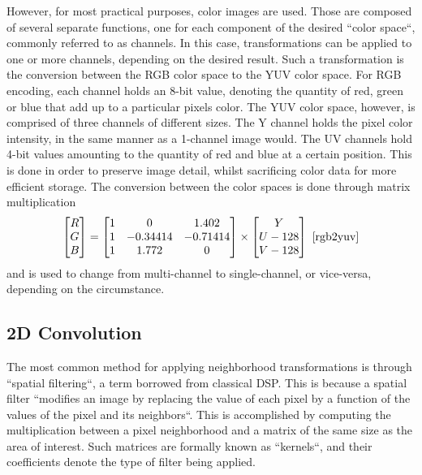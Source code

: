 However, for most practical purposes, color images are used. Those are composed of several separate functions,
one for each component of the desired ``color space``, commonly referred to as channels. In this case,
transformations can be applied to one or more channels, depending on the desired result. Such a transformation
is the conversion between the RGB color space to the YUV color space. For RGB encoding, each channel holds
an 8-bit value, denoting the quantity of red, green or blue that add up to a particular pixels color. The YUV
color space, however, is comprised of three channels of different sizes. The Y channel holds the pixel color
intensity, in the same manner as a 1-channel image would. The UV channels hold 4-bit values amounting to the
quantity of red and blue at a certain position. This is done in order to preserve image detail, whilst
sacrificing color data for more efficient storage. The conversion between the color spaces is done through
matrix multiplication
\[
	\begin{bmatrix}
		R \\
		G \\
		B \\
	\end{bmatrix}
	=
	\begin{bmatrix}
		1 & 0        & 1.402    \\
		1 & -0.34414 & -0.71414 \\
		1 & 1.772    & 0        \\
	\end{bmatrix}
	\times
	\begin{bmatrix}
		Y       \\
		U - 128 \\
		V - 128 \\
	\end{bmatrix}
	\text{ \cite{rgb2yuv}}
\]
and is used to change from multi-channel to single-channel, or vice-versa, depending on the circumstance.
\cite{rgb2yuv}

\subsection{2D Convolution}

The most common method for applying neighborhood transformations is through ``spatial filtering``, a term
borrowed from classical DSP. This is because a spatial filter ``modifies an image by replacing the value
of each pixel by a function of the values of the pixel and its neighbors``. This is accomplished by computing
the multiplication between a pixel neighborhood and a matrix of the same size as the area of interest. Such
matrices are formally known as ``kernels``, and their coefficients denote the type of filter being applied.
\cite{dspBook}

